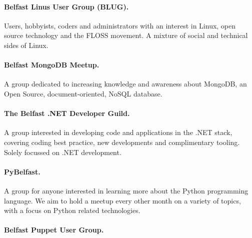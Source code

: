 \paragraph{Belfast Linus User Group (BLUG).} Users, hobbyists, coders and administrators with an interest in Linux, open source technology and the FLOSS movement. A mixture of social and technical sides of Linux.

\paragraph{Belfast MongoDB Meetup.} A group dedicated to increasing knowledge and awareness about MongoDB, an Open Source, document-oriented, NoSQL database.

\paragraph{The Belfast .NET Developer Guild.} A group interested in developing code and applications in the .NET stack, covering coding best practice, new developments and complimentary tooling. Solely focussed on .NET development.

\paragraph{PyBelfast.} A group for anyone interested in learning more about the Python programming language. We aim to hold a meetup every other month on a variety of topics, with a focus on Python related technologies.

\paragraph{Belfast Puppet User Group.} 